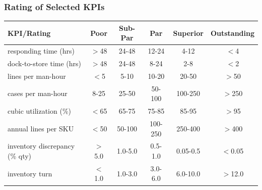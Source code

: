 \documentclass[10pt,handout,notes=show]{beamer}
\begin{document}
\begin{frame}
  \frametitle{Rating of Selected KPIs}


  \begin{center}\small{
  \begin{tabular}{lccccc}\hline
    KPI/Rating 	                 &Poor 	  &Sub-Par 	&Par 	&Superior 	&Outstanding \\ \hline
    responding time (hrs) 	     &$>$48 	&24-48 	  &12-24	  &4-12	   &$<$4  \\
    dock-to-store time (hrs) 	   &$>$48 	&24-48 	  &8-24 	  &2-8	   &$<$2 \\
    lines per man-hour 	         &$<$5 	  &5-10	    &10-20	  &20-50 	 &$>$50 \\
    cases per man-hour 	         &8-25	  &25-50 	  &50-100 	&100-250 	&$>$250 \\
    cubic utilization (\%) 	     &$<$65   &65-75 	  &75-85 	  &85-95 & $>$95 \\
    annual lines per SKU 	       &$<$50 	&50-100	  &100-250 	&250-400	&$>$400 \\
    inventory discrepancy (\% qty)  &$>$5.0 	&1.0-5.0 	&0.5-1.0 	&0.05-0.5	 &$<$0.05 \\
    inventory turn 	             &$<$1.0 	&1.0-3.0 	&3.0-6.0 	&6.0-10.0  &$>$12.0 \\ \hline
  \end{tabular} }
  \end{center}




  \end{frame}
\end{document}
